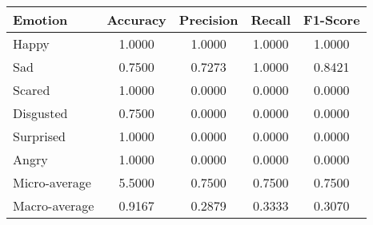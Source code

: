 \begin{tabular}{lcccc}
\toprule
Emotion & Accuracy & Precision & Recall & F1-Score \\
\midrule
Happy & 1.0000 & 1.0000 & 1.0000 & 1.0000 \\
Sad & 0.7500 & 0.7273 & 1.0000 & 0.8421 \\
Scared & 1.0000 & 0.0000 & 0.0000 & 0.0000 \\
Disgusted & 0.7500 & 0.0000 & 0.0000 & 0.0000 \\
Surprised & 1.0000 & 0.0000 & 0.0000 & 0.0000 \\
Angry & 1.0000 & 0.0000 & 0.0000 & 0.0000 \\
Micro-average & 5.5000 & 0.7500 & 0.7500 & 0.7500 \\
Macro-average & 0.9167 & 0.2879 & 0.3333 & 0.3070 \\
\bottomrule
\end{tabular}
